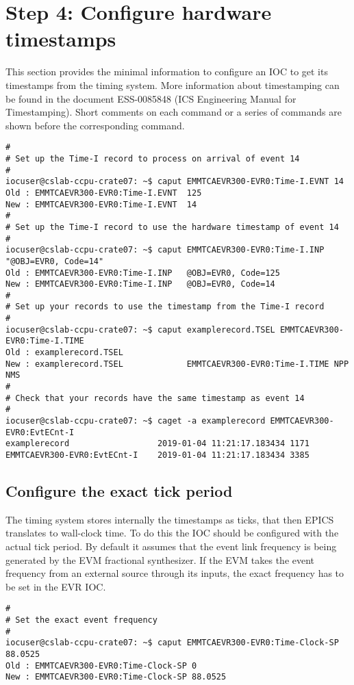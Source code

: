 \documentclass[11pt
  , a4paper
  , article
  , oneside
  , showtrims
]{memoir}
\begin{document}
{\section{Step 4: Configure hardware timestamps}
This section provides the minimal information to configure an IOC to get its timestamps from the timing system. More information about timestamping can be found in the document ESS-0085848 (ICS Engineering Manual for Timestamping). Short comments on each command or a series of commands are shown before the corresponding command.
\begin{lstlisting}[style=termstyle]
#
# Set up the Time-I record to process on arrival of event 14
#
iocuser@cslab-ccpu-crate07: ~$ caput EMMTCAEVR300-EVR0:Time-I.EVNT 14
Old : EMMTCAEVR300-EVR0:Time-I.EVNT  125
New : EMMTCAEVR300-EVR0:Time-I.EVNT  14
#
# Set up the Time-I record to use the hardware timestamp of event 14
#
iocuser@cslab-ccpu-crate07: ~$ caput EMMTCAEVR300-EVR0:Time-I.INP "@OBJ=EVR0, Code=14"
Old : EMMTCAEVR300-EVR0:Time-I.INP   @OBJ=EVR0, Code=125
New : EMMTCAEVR300-EVR0:Time-I.INP   @OBJ=EVR0, Code=14
#
# Set up your records to use the timestamp from the Time-I record
#
iocuser@cslab-ccpu-crate07: ~$ caput examplerecord.TSEL EMMTCAEVR300-EVR0:Time-I.TIME
Old : examplerecord.TSEL
New : examplerecord.TSEL             EMMTCAEVR300-EVR0:Time-I.TIME NPP NMS
#
# Check that your records have the same timestamp as event 14
#
iocuser@cslab-ccpu-crate07: ~$ caget -a examplerecord EMMTCAEVR300-EVR0:EvtECnt-I
examplerecord                  2019-01-04 11:21:17.183434 1171
EMMTCAEVR300-EVR0:EvtECnt-I    2019-01-04 11:21:17.183434 3385
\end{lstlisting}

\subsection{Configure the exact tick period}
The timing system stores internally the timestamps as ticks, that then EPICS translates to wall-clock time. To do this the IOC should be configured with the actual tick period. By default it assumes that the event link frequency is being generated by the EVM fractional synthesizer. If the EVM takes the event frequency from an external source through its inputs, the exact frequency has to be set in the EVR IOC.
\begin{lstlisting}[style=termstyle]
#
# Set the exact event frequency
#
iocuser@cslab-ccpu-crate07: ~$ caput EMMTCAEVR300-EVR0:Time-Clock-SP 88.0525
Old : EMMTCAEVR300-EVR0:Time-Clock-SP 0
New : EMMTCAEVR300-EVR0:Time-Clock-SP 88.0525
\end{lstlisting}


}
\end{document}
